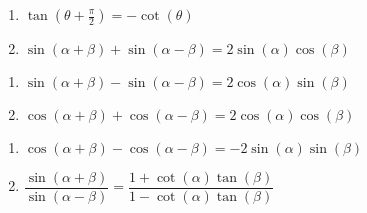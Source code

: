 \begin{multicols}{2}

\begin{enumerate}

\setcounter{enumi}{\value{HW}}

\item $\tan\left(\theta + \frac{\pi}{2} \right) = -\cot(\theta)$
\item $\sin(\alpha + \beta) + \sin(\alpha - \beta) = 2\sin(\alpha)\cos(\beta)$ 

\setcounter{HW}{\value{enumi}}

\end{enumerate}

\end{multicols}

\begin{multicols}{2}

\begin{enumerate}

\setcounter{enumi}{\value{HW}}

\item $\sin(\alpha + \beta) - \sin(\alpha - \beta) = 2\cos(\alpha) \sin(\beta)$
\item $\cos(\alpha + \beta) + \cos(\alpha - \beta) = 2\cos(\alpha) \cos(\beta)$

\setcounter{HW}{\value{enumi}}

\end{enumerate}

\end{multicols}

\begin{multicols}{2}

\begin{enumerate}

\setcounter{enumi}{\value{HW}}

\item $\cos(\alpha + \beta) - \cos(\alpha - \beta) = -2\sin(\alpha) \sin(\beta)$ \vphantom{$\dfrac{\sin(\alpha+\beta)}{\sin(\alpha-\beta)}$}
\item $\dfrac{\sin(\alpha+\beta)}{\sin(\alpha-\beta)} = \dfrac{1+\cot(\alpha) \tan(\beta)}{1 - \cot(\alpha) \tan(\beta)}$ 

\setcounter{HW}{\value{enumi}}

\end{enumerate}

\end{multicols}

